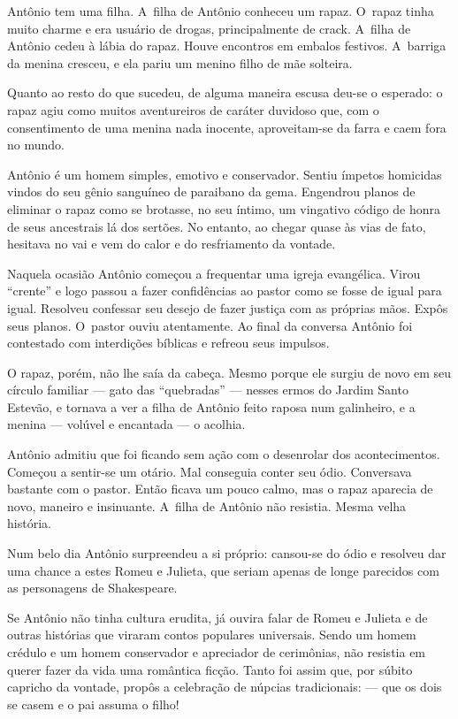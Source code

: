 Antônio tem uma filha. A~filha de Antônio conheceu um rapaz. O~rapaz
tinha muito charme e era usuário de drogas, principalmente de crack. A~filha de Antônio cedeu à lábia do rapaz. Houve encontros em embalos
festivos. A~barriga da menina cresceu, e ela pariu um menino filho de
mãe solteira.

Quanto ao resto do que sucedeu, de alguma maneira escusa deu-se o
esperado: o rapaz agiu como muitos aventureiros de caráter duvidoso que,
com o consentimento de uma menina nada inocente, aproveitam-se da farra
e caem fora no mundo.

Antônio é um homem simples, emotivo e conservador. Sentiu ímpetos
homicidas vindos do seu gênio sanguíneo de paraibano da gema. Engendrou
planos de eliminar o rapaz como se brotasse, no seu íntimo, um vingativo
código de honra de seus ancestrais lá dos sertões. No entanto, ao chegar
quase às vias de fato, hesitava no vai e vem do calor e do resfriamento
da vontade.

Naquela ocasião Antônio começou a frequentar uma igreja evangélica.
Virou ``crente'' e logo passou a fazer confidências ao pastor como se
fosse de igual para igual. Resolveu confessar seu desejo de fazer
justiça com as próprias mãos. Expôs seus planos. O~pastor ouviu
atentamente. Ao final da conversa Antônio foi contestado com interdições
bíblicas e refreou seus impulsos.

O rapaz, porém, não lhe saía da cabeça. Mesmo porque ele surgiu de novo
em seu círculo familiar --- gato das ``quebradas'' --- nesses ermos do
Jardim Santo Estevão, e tornava a ver a filha de Antônio feito raposa
num galinheiro, e a menina --- volúvel e encantada --- o acolhia.

Antônio admitiu que foi ficando sem ação com o desenrolar dos
acontecimentos. Começou a sentir-se um otário. Mal conseguia conter seu
ódio. Conversava bastante com o pastor. Então ficava um pouco calmo, mas
o rapaz aparecia de novo, maneiro e insinuante. A~filha de Antônio não
resistia. Mesma velha história.

Num belo dia Antônio surpreendeu a si próprio: cansou-se do ódio e
resolveu dar uma chance a estes Romeu e Julieta, que seriam apenas de
longe parecidos com as personagens de Shakespeare.

Se Antônio não tinha cultura erudita, já ouvira falar de Romeu e Julieta
e de outras histórias que viraram contos populares universais. Sendo um
homem crédulo e um homem conservador e apreciador de cerimônias, não
resistia em querer fazer da vida uma romântica ficção. Tanto foi assim
que, por súbito capricho da vontade, propôs a celebração de núpcias
tradicionais: --- que os dois se casem e o pai assuma o filho!

